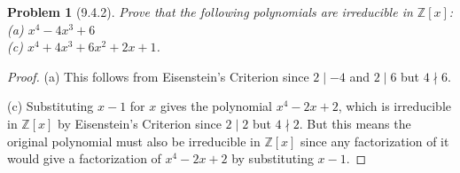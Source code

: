 \documentclass{article}
\newtheorem{problem}{Problem}
\begin{document}

\begin{problem}[9.4.2]
Prove that the following polynomials are irreducible in $\mathbb{Z}[x]$:\\
(a) $x^4-4x^3+6$\\
(c) $x^4+4x^3+6x^2+2x+1$.
\end{problem}
\begin{proof}
(a) This follows from Eisenstein's Criterion since $2 \mid -4$ and $2 \mid 6$ but $4 \nmid 6$.

(c) Substituting $x-1$ for $x$ gives the polynomial $x^4-2x+2$, which is irreducible in $\mathbb{Z}[x]$ by Eisenstein's Criterion since $2 \mid 2$ but $4 \nmid 2$. But this means the original polynomial must also be irreducible in $\mathbb{Z}[x]$ since any factorization of it would give a factorization of $x^4-2x+2$ by substituting $x-1$.
\end{proof}
\end{document}
